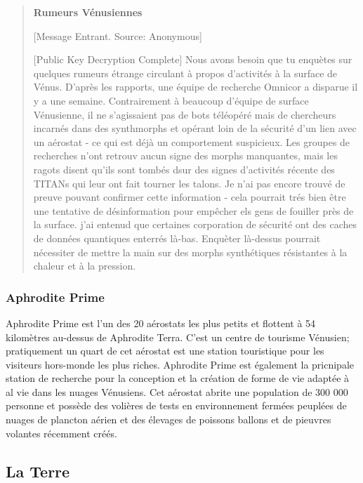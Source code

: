 \begin{quotation} \textbf{Rumeurs Vénusiennes} 

[Message Entrant. Source: Anonymous] 

[Public Key Decryption Complete] Nous avons besoin que tu enquètes sur quelques rumeurs étrange circulant à propos d'activités à la surface de Vénus. D'après les rapports, une équipe de recherche Omnicor a disparue il y a une semaine. Contrairement à beaucoup d'équipe de surface Vénusienne, il ne s'agissaient pas de bots téléopéré mais de chercheurs incarnés dans des synthmorphs et opérant loin de la sécurité d'un lien avec un aérostat - ce qui est déjà un comportement suspicieux. Les groupes de recherches n'ont retrouv aucun signe des morphs manquantes, mais les ragots disent qu'ils sont tombés dsur des signes d'activités récente des TITANs qui leur ont fait tourner les talons. Je n'ai pas encore trouvé de preuve pouvant confirmer cette information - cela pourrait trés bien être une tentative de désinformation pour empêcher els gens de fouiller près de la surface. j'ai entenud que certaines corporation de sécurité ont des caches de données quantiques enterrés là-bas. Enquèter là-dessus pourrait nécessiter de mettre la main sur des morphs synthétiques résistantes à la chaleur et à la pression. \end{quotation} 

\subsubsection{Aphrodite Prime} \label{sec:aphrodite-prime} 

Aphrodite Prime est l'un des 20 aérostats les plus petits et flottent à 54 kilomètres au-dessus de Aphrodite Terra. C'est un centre de tourisme Vénusien; pratiquement un quart de cet aérostat est une station touristique pour  les visiteurs hors-monde les plus riches. Aphrodite Prime est également la pricnipale station de recherche pour la conception et la création de forme de vie adaptée à al vie dans les nuages Vénusiens. Cet aérostat abrite une population de 300 000 personne et possède des volières de tests en environnement fermées peuplées de nuages de plancton aérien et des élevages de poissons ballons et de pieuvres volantes récemment créés. 

\subsection{La Terre} \label{sec:earth} 

